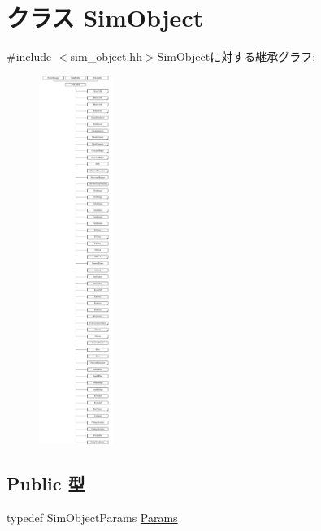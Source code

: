 \hypertarget{classSimObject}{
\section{クラス SimObject}
\label{classSimObject}
}


{\ttfamily \#include $<$sim\_\-object.hh$>$}SimObjectに対する継承グラフ:\begin{figure}[H]
\begin{center}
\leavevmode
\includegraphics[height=12cm]{classSimObject}
\end{center}
\end{figure}
\subsection*{Public 型}
\begin{DoxyCompactItemize}
\item 
typedef SimObjectParams \hyperlink{classSimObject_a0f0761d2db586a23bb2a2880b8f387bb}{Params}
\end{DoxyCompactItemize}
